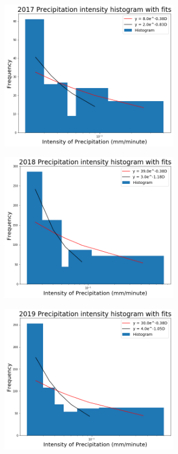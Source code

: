 \documentclass[11pt]{report}
\begin{document}
\clearpage
\begin{figure}[t]
	\centering
	\includegraphics[width=0.675\textwidth]{Figures/inten2017_fit.png}
	\caption[Fitting Intensity histogram for 2017 with different bins]
	{\label{i2017_fit} }
\end{figure}
\begin{figure}[b]
	\centering
	\includegraphics[width=0.675\textwidth]{Figures/inten2018_fit.png}
	\caption[Fitting Intensity histogram for 2018 with different bins]
	{\label{i2018_fit} }
\end{figure}
\clearpage
\begin{figure}[t]
	\centering
	\includegraphics[width=0.675\textwidth]{Figures/inten2019_fit.png}
	\caption[Fitting Intensity histogram for 2019 with different bins]
	{\label{i2019_fit}  
	}
\end{figure}
\end{document}
